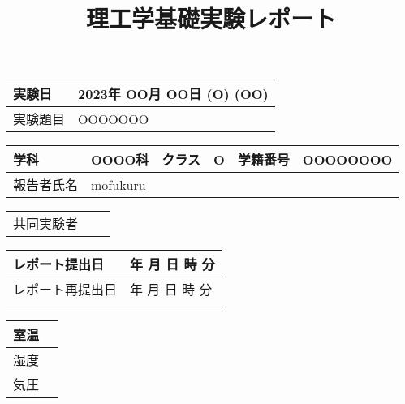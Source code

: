 \documentclass[a4paper, 11pt]{ltjsarticle}
\title{理工学基礎実験レポート}
\date{}
\author{}
\begin{document}
\maketitle
\renewcommand{\arraystretch}{1.5}
\begin{table}[h]
    \centering
    \begin{tabular}{|p{27.8mm}|p{122.5mm}|}
        \hline
        実験日 & 2023年 OO月 OO日 (O) (OO) \\ \hline
        実験題目 & OOOOOOO  \\ \hline
    \end{tabular}
\end{table}

\begin{table}[h]
    \centering
    \begin{tabular}{|p{18mm}|p{31.5mm}|p{15mm}|p{15mm}|p{20mm}|p{33.2mm}|}
        \hline
        学科 & OOOO科 & クラス & O & 学籍番号 & OOOOOOOO \\ \hline
        報告者氏名 & \multicolumn{5}{|l|}{\large mofukuru} \\ \hline
    \end{tabular}
\end{table}

\begin{table}[h]
    \centering
    \begin{tabular}{|p{18mm}|p{64.5mm}|p{64.5mm}|}
        \hline
        \multirow{4}{*}{共同実験者} &  &  \\ \cline{2-3}
                                &  &  \\ \cline{2-3}
                                &  &  \\ \cline{2-3}
                                &  &  \\ \hline
    \end{tabular}
\end{table}

\begin{table}[h]
    \centering
    \begin{tabular}{|p{35mm}|p{117mm}|}
        \hline
        レポート提出日 & 年 月 日 時 分 \\ \hline
        レポート再提出日 & 年 月 日 時 分 \\ \hline
        & \\ \hline
    \end{tabular}
\end{table}

\begin{table}[h]
    \begin{tabular}{|p{10mm}|p{25mm}|}
        \hline
        室温 &  \\ \hline
        湿度 &  \\ \hline
        気圧 &  \\ \hline
    \end{tabular}
\end{table}
\renewcommand{\arraystretch}{1.0}
\end{document}
